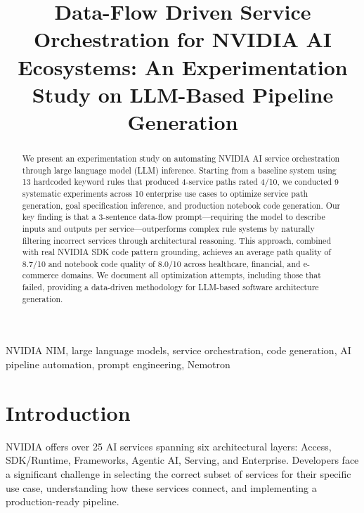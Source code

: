 \documentclass[conference]{IEEEtran}
\begin{document}
\title{Data-Flow Driven Service Orchestration for NVIDIA AI Ecosystems: An Experimentation Study on LLM-Based Pipeline Generation}

\author{
}

\maketitle

\begin{abstract}
We present an experimentation study on automating NVIDIA AI service orchestration through large language model (LLM) inference. Starting from a baseline system using 13 hardcoded keyword rules that produced 4-service paths rated 4/10, we conducted 9 systematic experiments across 10 enterprise use cases to optimize service path generation, goal specification inference, and production notebook code generation. Our key finding is that a 3-sentence data-flow prompt---requiring the model to describe inputs and outputs per service---outperforms complex rule systems by naturally filtering incorrect services through architectural reasoning. This approach, combined with real NVIDIA SDK code pattern grounding, achieves an average path quality of 8.7/10 and notebook code quality of 8.0/10 across healthcare, financial, and e-commerce domains. We document all optimization attempts, including those that failed, providing a data-driven methodology for LLM-based software architecture generation.
\end{abstract}

\begin{IEEEkeywords}
NVIDIA NIM, large language models, service orchestration, code generation, AI pipeline automation, prompt engineering, Nemotron
\end{IEEEkeywords}

\section{Introduction}

NVIDIA offers over 25 AI services spanning six architectural layers: Access, SDK/Runtime, Frameworks, Agentic AI, Serving, and Enterprise. Developers face a significant challenge in selecting the correct subset of services for their specific use case, understanding how these services connect, and implementing a production-ready pipeline.
\end{document}
